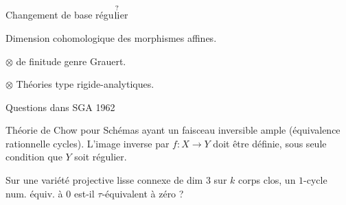 Changement de base régu\(\overset{\text{\scriptsize ?}}{\text{li}}\)er 

Dimension cohomologique des morphismes affines.

$\otimes$  de finitude genre Grauert.

$\otimes$ Théories  type rigide-analytiques.

Questions dans SGA 1962


 Théorie de Chow pour Schémas  ayant un faisceau inversible ample (équivalence rationnelle \unsure{,} cycles). L'image inverse par $f:X\to Y$ doit être définie, sous seule condition que $Y$ soit régulier.

\hspace{.4em} Sur une variété projective lisse connexe de dim $3$ sur $k$ corps  clos, un $1$-cycle num. équiv. à $0$ est-il $\tau$-équivalent à zéro ? 
\normalmarginpar

